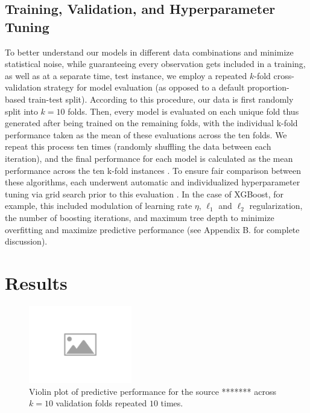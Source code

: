 \documentclass[fleqn,usenatbib]{mnras}
\begin{document}
\subsection{Training, Validation, and Hyperparameter Tuning}\label{subsec:train_validate_tune}

To better understand our models in different data combinations and minimize statistical noise, while guaranteeing every observation gets included in a training, as well as at a separate time, test instance, we employ a repeated $k$-fold cross-validation strategy \citep{repeated_k_fold} for model evaluation (as opposed to a default proportion-based train-test split). According to this procedure, our data is first randomly split into $k=10$ folds. Then, every model is evaluated on each unique fold thus generated after being trained on the remaining folds, with the individual k-fold performance taken as the mean of these evaluations across the ten folds. We repeat this process ten times (randomly shuffling the data between each iteration), and the final performance for each model is calculated as the mean performance across the ten k-fold instances \citep{kuhn2019applied}. To ensure fair comparison between these algorithms, each underwent automatic and individualized hyperparameter tuning via grid search prior to this evaluation \citep{dangeti2017statisticsML}. In the case of XGBoost, for example, this included modulation of learning rate $\eta$, $\ell_{1}$ and $\ell_{2}$ regularization, the number of boosting iterations, and maximum tree depth to minimize overfitting and maximize predictive performance (see Appendix B. for complete discussion). 

\section{Results} \label{sec:results}

\begin{figure}
    \centering
    \includegraphics[width=0.4\textwidth]{figures/placeholder-image.png}
    \caption{Violin plot of predictive performance for the source ******* across $k=10$ validation folds repeated $10$ times.}
    \label{fig:average_performances}
\end{figure}
\end{document}
